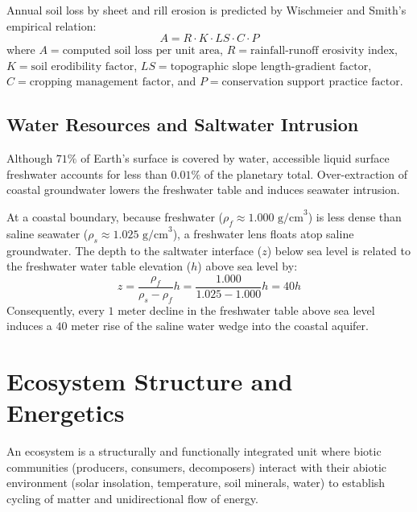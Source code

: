 \begin{keyequation}
Annual soil loss by sheet and rill erosion is predicted by Wischmeier and Smith's empirical relation:
\begin{equation}
A = R \cdot K \cdot LS \cdot C \cdot P
\end{equation}
where $A = \text{computed soil loss per unit area}$, $R = \text{rainfall-runoff erosivity index}$, $K = \text{soil erodibility factor}$, $LS = \text{topographic slope length-gradient factor}$, $C = \text{cropping management factor}$, and $P = \text{conservation support practice factor}$.
\end{keyequation}

\subsection{Water Resources and Saltwater Intrusion}
Although $71\%$ of Earth's surface is covered by water, accessible liquid surface freshwater accounts for less than $0.01\%$ of the planetary total. Over-extraction of coastal groundwater lowers the freshwater table and induces seawater intrusion.

\begin{theorem}
At a coastal boundary, because freshwater ($\rho_f \approx 1.000\text{ g/cm}^3$) is less dense than saline seawater ($\rho_s \approx 1.025\text{ g/cm}^3$), a freshwater lens floats atop saline groundwater. The depth to the saltwater interface ($z$) below sea level is related to the freshwater water table elevation ($h$) above sea level by:
\begin{equation}
z = \frac{\rho_f}{\rho_s - \rho_f} h = \frac{1.000}{1.025 - 1.000} h = 40 h
\end{equation}
Consequently, every $1\text{ meter}$ decline in the freshwater table above sea level induces a $40\text{ meter}$ rise of the saline water wedge into the coastal aquifer.
\end{theorem}

\section{Ecosystem Structure and Energetics}
An ecosystem is a structurally and functionally integrated unit where biotic communities (producers, consumers, decomposers) interact with their abiotic environment (solar insolation, temperature, soil minerals, water) to establish cycling of matter and unidirectional flow of energy.

